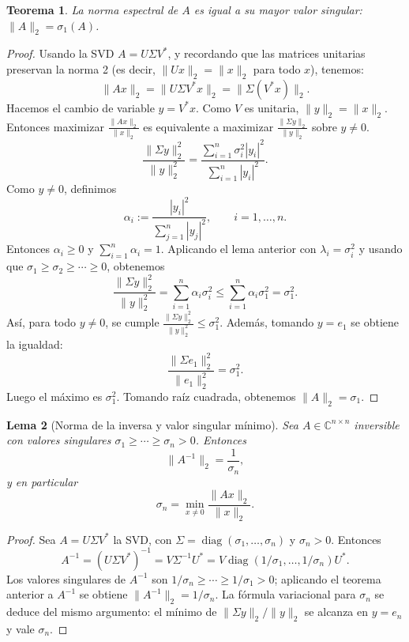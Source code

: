\documentclass[a4paper,11pt]{report}
\newtheorem{theorem}{Teorema}[chapter]
\newtheorem{lemma}[theorem]{Lema}
\begin{document}
\begin{theorem}
La norma espectral de $A$ es igual a su mayor valor singular: $\|A\|_2 = \sigma_1(A)$.
\end{theorem}
\begin{proof}
Usando la SVD $A = U \Sigma V^*$, y recordando que las matrices unitarias preservan la norma 2 (es decir, $\|Ux\|_2 = \|x\|_2$ para todo $x$), tenemos:
\[
\|Ax\|_2 = \|U \Sigma V^* x\|_2 = \|\Sigma (V^* x)\|_2.
\]
Hacemos el cambio de variable $y = V^* x$. Como $V$ es unitaria, $\|y\|_2 = \|x\|_2$. Entonces maximizar $\frac{\|Ax\|_2}{\|x\|_2}$ es equivalente a maximizar $\frac{\|\Sigma y\|_2}{\|y\|_2}$ sobre $y \neq 0$.
\[
\frac{\|\Sigma y\|_2^2}{\|y\|_2^2} = \frac{\sum_{i=1}^n \sigma_i^2 |y_i|^2}{\sum_{i=1}^n |y_i|^2}.
\]
Como $y\neq 0$, definimos
\[
\alpha_i:=\frac{|y_i|^2}{\sum_{j=1}^n |y_j|^2},\qquad i=1,\dots,n.
\]
Entonces $\alpha_i\ge 0$ y $\sum_{i=1}^n \alpha_i=1$. Aplicando el lema anterior con $\lambda_i=\sigma_i^2$ y usando que $\sigma_1\ge\sigma_2\ge\cdots\ge 0$, obtenemos
\[
\frac{\|\Sigma y\|_2^2}{\|y\|_2^2}=\sum_{i=1}^n \alpha_i\sigma_i^2
\le \sum_{i=1}^n \alpha_i\sigma_1^2=\sigma_1^2.
\]
Así, para todo $y\neq 0$, se cumple $\frac{\|\Sigma y\|_2^2}{\|y\|_2^2}\le \sigma_1^2$. Además, tomando $y=e_1$ se obtiene la igualdad:
\[
\frac{\|\Sigma e_1\|_2^2}{\|e_1\|_2^2}=\sigma_1^2.
\]
Luego el máximo es $\sigma_1^2$. Tomando raíz cuadrada, obtenemos $\|A\|_2 = \sigma_1$.
\end{proof}

\begin{lemma}[Norma de la inversa y valor singular mínimo]\label{lem:norma_inversa_sigma_min}
Sea $A\in\mathbb{C}^{n\times n}$ inversible con valores singulares $\sigma_1\ge\cdots\ge\sigma_n>0$. Entonces
\[
\|A^{-1}\|_2 = \frac{1}{\sigma_n},
\]
y en particular
\[
\sigma_n = \min_{x\neq 0}\frac{\|Ax\|_2}{\|x\|_2}.
\]
\end{lemma}
\begin{proof}
Sea $A=U\Sigma V^*$ la SVD, con $\Sigma=\operatorname{diag}(\sigma_1,\ldots,\sigma_n)$ y $\sigma_n>0$.  Entonces
\[
A^{-1}=(U\Sigma V^*)^{-1}=V\Sigma^{-1}U^*=V\operatorname{diag}(1/\sigma_1,\ldots,1/\sigma_n)U^*.
\]
Los valores singulares de $A^{-1}$ son $1/\sigma_n\ge\cdots\ge 1/\sigma_1>0$; aplicando el teorema anterior a $A^{-1}$ se obtiene $\|A^{-1}\|_2=1/\sigma_n$.  La fórmula variacional para $\sigma_n$ se deduce del mismo argumento: el mínimo de $\|\Sigma y\|_2/\|y\|_2$ se alcanza en $y=e_n$ y vale $\sigma_n$.
\end{proof}
\end{document}
